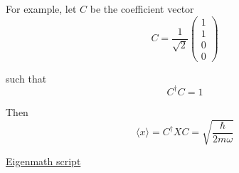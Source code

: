 For example, let $C$ be the coefficient vector
\begin{equation*}
C=\frac{1}{\sqrt2}\begin{pmatrix}1\\1\\0\\0\end{pmatrix}
\end{equation*}

such that
\begin{equation*}
C^\dag C=1
\end{equation*}

Then
\begin{equation*}
\langle x\rangle=
C^\dag XC=\sqrt{\frac{\hbar}{2m\omega}}
\tag{1}
\end{equation*}

\href{https://georgeweigt.github.io/examples/harmonic-oscillator-4-demo.html}{Eigenmath script}


